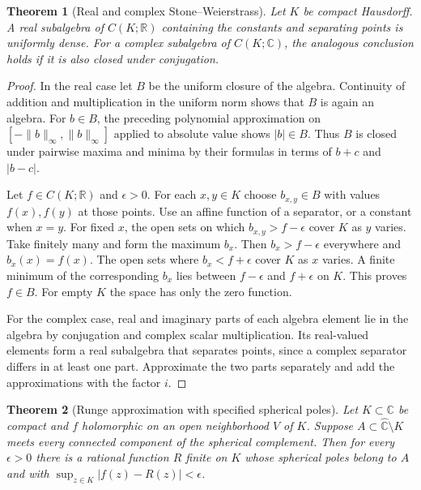 \documentclass[11pt,oneside,openany]{book}
\newtheorem{theorem}{Theorem}[chapter]
\theoremstyle{definition}
\theoremstyle{remark}
\begin{document}
\begin{theorem}[Real and complex Stone--Weierstrass]
\label{p102:AN-13-C03-R01}
Let $K$ be compact Hausdorff. A real subalgebra of $C(K;\mathbb R)$
containing the constants and separating points is uniformly dense.
For a complex subalgebra of $C(K;\mathbb C)$, the analogous conclusion
holds if it is also closed under conjugation.
\end{theorem}

\begin{proof}
In the real case let $B$ be the uniform closure of the algebra.
Continuity of addition and multiplication in the uniform norm shows
that $B$ is again an algebra. For $b\in B$, the preceding polynomial
approximation on $[-\|b\|_\infty,\|b\|_\infty]$ applied to absolute
value shows $|b|\in B$. Thus $B$ is closed under pairwise maxima
and minima by their formulas in terms of $b+c$ and $|b-c|$.

Let $f\in C(K;\mathbb R)$ and $\epsilon>0$. For each $x,y\in K$
choose $b_{x,y}\in B$ with values $f(x),f(y)$ at those points.
Use an affine function of a separator, or a constant when $x=y$.
For fixed $x$, the open sets on which $b_{x,y}>f-\epsilon$ cover
$K$ as $y$ varies. Take finitely many and form the maximum $b_x$.
Then $b_x>f-\epsilon$ everywhere and $b_x(x)=f(x)$. The open sets
where $b_x<f+\epsilon$ cover $K$ as $x$ varies. A finite minimum
of the corresponding $b_x$ lies between $f-\epsilon$ and
$f+\epsilon$ on $K$. This proves $f\in B$. For empty $K$ the
space has only the zero function.

For the complex case, real and imaginary parts of each algebra
element lie in the algebra by conjugation and complex scalar
multiplication. Its real-valued elements form a real subalgebra
that separates points, since a complex separator differs in
at least one part. Approximate the two parts separately and add
the approximations with the factor $i$.
\end{proof}

\begin{theorem}[Runge approximation with specified spherical poles]
\label{p102:AN-13-C02-R02}
Let $K\subset\mathbb C$ be compact and $f$ holomorphic on an open
neighborhood $V$ of $K$. Suppose $A\subset\widehat{\mathbb C}\setminus K$
meets every connected component of the spherical complement.
Then for every $\epsilon>0$ there is a rational function $R$
finite on $K$ whose spherical poles belong to $A$ and with
$\sup_{z\in K}|f(z)-R(z)|<\epsilon$.
\end{theorem}
\end{document}
